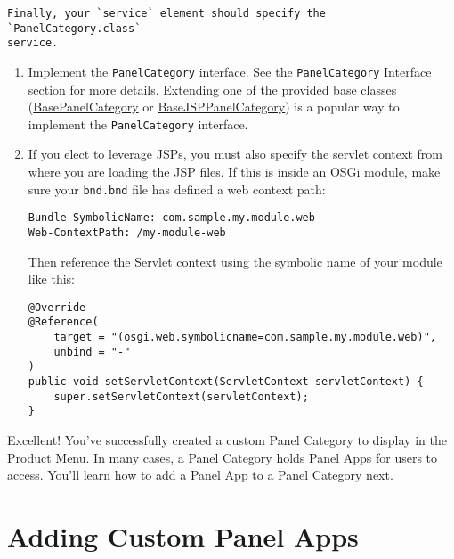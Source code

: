 \noindent\hrulefill

\begin{verbatim}
Finally, your `service` element should specify the `PanelCategory.class`
service.
\end{verbatim}

\begin{enumerate}
\def\labelenumi{\arabic{enumi}.}
\setcounter{enumi}{1}
\item
  Implement the \texttt{PanelCategory} interface. See the
  \href{/docs/7-2/customization/-/knowledge_base/c/customizing-the-product-menu\#panelcategory-interface}{\texttt{PanelCategory}
  Interface} section for more details. Extending one of the provided
  base classes
  (\href{/docs/7-2/customization/-/knowledge_base/c/customizing-the-product-menu\#basepanelcategory}{BasePanelCategory}
  or
  \href{/docs/7-2/customization/-/knowledge_base/c/customizing-the-product-menu\#basejsppanelcategory}{BaseJSPPanelCategory})
  is a popular way to implement the \texttt{PanelCategory} interface.
\item
  If you elect to leverage JSPs, you must also specify the servlet
  context from where you are loading the JSP files. If this is inside an
  OSGi module, make sure your \texttt{bnd.bnd} file has defined a web
  context path:

\begin{verbatim}
Bundle-SymbolicName: com.sample.my.module.web
Web-ContextPath: /my-module-web
\end{verbatim}

  Then reference the Servlet context using the symbolic name of your
  module like this:

\begin{verbatim}
@Override
@Reference(
    target = "(osgi.web.symbolicname=com.sample.my.module.web)",
    unbind = "-"
)
public void setServletContext(ServletContext servletContext) {
    super.setServletContext(servletContext);
}
\end{verbatim}
\end{enumerate}

Excellent! You've successfully created a custom Panel Category to
display in the Product Menu. In many cases, a Panel Category holds Panel
Apps for users to access. You'll learn how to add a Panel App to a Panel
Category next.

\chapter{Adding Custom Panel Apps}\label{adding-custom-panel-apps}

